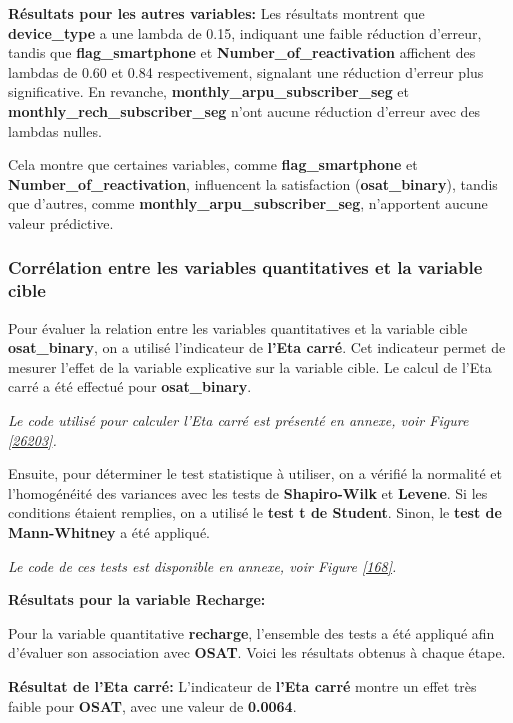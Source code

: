 \textbf{\checkmark Résultats pour les autres variables:} Les résultats montrent que \textbf{device\_type} a une lambda de 0.15, indiquant une faible réduction d'erreur, tandis que \textbf{flag\_smartphone} et \textbf{Number\_of\_reactivation} affichent des lambdas de 0.60 et 0.84 respectivement, signalant une réduction d'erreur plus significative. En revanche, \textbf{monthly\_arpu\_subscriber\_seg} et \textbf{monthly\_rech\_subscriber\_seg} n'ont aucune réduction d'erreur avec des lambdas nulles.

Cela montre que certaines variables, comme \textbf{flag\_smartphone} et \textbf{Number\_of\_reactivation}, influencent la satisfaction (\textbf{osat\_binary}), tandis que d'autres, comme \textbf{monthly\_arpu\_subscriber\_seg}, n'apportent aucune valeur prédictive.

\subsubsection*{Corrélation entre les variables quantitatives et la variable cible}

Pour évaluer la relation entre les variables quantitatives et la variable cible \textbf{osat\_binary}, on a utilisé l'indicateur de \textbf{l'Eta carré}. Cet indicateur permet de mesurer l'effet de la variable explicative sur la variable cible. Le calcul de l'Eta carré a été effectué pour \textbf{osat\_binary}.

\textit{Le code utilisé pour calculer l'Eta carré est présenté en annexe, voir Figure \ref{26203}.}

Ensuite, pour déterminer le test statistique à utiliser, on a vérifié la normalité et l'homogénéité des variances avec les tests de \textbf{Shapiro-Wilk} et \textbf{Levene}. Si les conditions étaient remplies, on a utilisé le \textbf{test t de Student}. Sinon, le \textbf{test de Mann-Whitney} a été appliqué.

\textit{Le code de ces tests est disponible en annexe, voir Figure \ref{168}.}

\textbf{Résultats pour la variable Recharge:}

Pour la variable quantitative \textbf{recharge}, l'ensemble des tests a été appliqué afin d'évaluer son association avec \textbf{OSAT}. Voici les résultats obtenus à chaque étape.

\textbf{\checkmark Résultat de l'Eta carré:} L'indicateur de \textbf{l'Eta carré} montre un effet très faible pour \textbf{OSAT}, avec une valeur de \textbf{0.0064}. 

